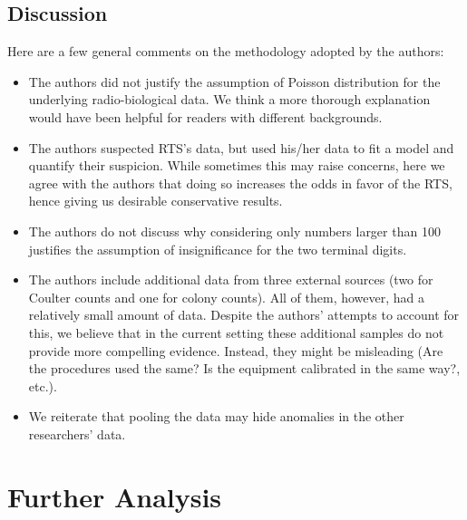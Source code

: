 \documentclass{article}
\begin{document}
\subsection{Discussion}\label{discussion-of-assumptions}

Here are a few general comments on the methodology adopted by the authors:
\begin{itemize}
    \item The authors did not justify the assumption of Poisson distribution for the underlying radio-biological data. We think a more thorough explanation would have been helpful for readers with different backgrounds.
    \item The authors suspected RTS's data, but used his/her data to fit a model and quantify their suspicion. While sometimes this may raise concerns, here we agree with the authors that doing so increases the odds in favor of the RTS, hence giving us desirable conservative results.
    \item The authors do not discuss why considering only numbers larger than 100 justifies the assumption of insignificance for the two terminal digits. 
    \item The authors include additional data from three external sources (two for Coulter counts and one for colony counts).
    All of them, however, had a relatively small amount of data.
    Despite the authors' attempts to account for this, we believe that in the current setting these additional samples do not provide more compelling evidence. 
    Instead, they might be misleading (Are the procedures used the same? Is the equipment calibrated in the same way?, etc.).
    \item We reiterate that pooling the data may hide anomalies in the other researchers' data.

\end{itemize}



    \section{Further Analysis}\label{our-analysis}
\end{document}
